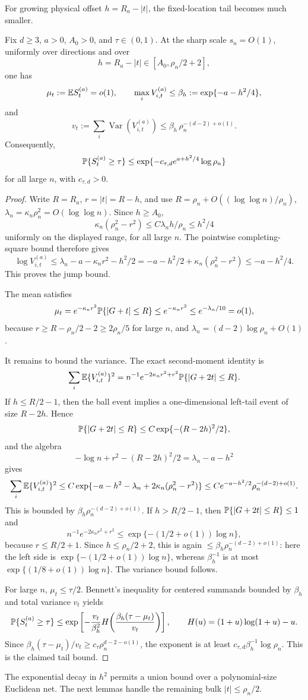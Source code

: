 For growing physical offset \(h=R_a-|t|\), the fixed-location tail becomes
much smaller.
\begin{lemma}
\label{lem:growing-offset-fixed-t}
Fix \(d\ge3\), \(a>0\), \(A_0>0\), and \(\tau\in(0,1)\).  At the sharp
scale \(s_n=O(1)\), uniformly over directions and over
\[
    h=R_a-|t|\in[A_0,\rho_n/2+2],
\]
one has
\[
    \mu_t:=\mathbb E S_t^{(a)}=o(1),\qquad
    \max_i V_{i,t}^{(a)}\le \beta_h:=\exp\{-a-h^2/4\},
\]
and
\[
    v_t:=\sum_i\operatorname{Var}(V_{i,t}^{(a)})
    \le
    \beta_h\,\rho_n^{-(d-2)+o(1)} .
\]
Consequently,
\[
    \mathbb P\{S_t^{(a)}\ge\tau\}
    \le
    \exp\{-c_{\tau,d}e^{a+h^2/4}\log\rho_n\}
\]
for all large \(n\), with \(c_{\tau,d}>0\).
\end{lemma}

\begin{proof}
Write \(R=R_a\), \(r=|t|=R-h\), and use \(R=\rho_n+O((\log\log n)/\rho_n)\),
\(\lambda_n=\kappa_n\rho_n^2=O(\log\log n)\).  Since \(h\ge A_0\),
\[
    \kappa_n(\rho_n^2-r^2)
    \le
    C\lambda_n h/\rho_n
    \le h^2/4
\]
uniformly on the displayed range, for all large \(n\).  The pointwise
completing-square bound therefore gives
\[
    \log V_{i,t}^{(a)}
    \le
    \lambda_n-a-\kappa_nr^2-h^2/2
    =
    -a-h^2/2+\kappa_n(\rho_n^2-r^2)
    \le -a-h^2/4 .
\]
This proves the jump bound.

The mean satisfies
\[
    \mu_t
    =
    e^{-\kappa_nr^2}\mathbb P\{|G+t|\le R\}
    \le
    e^{-\kappa_nr^2}
    \le
    e^{-\lambda_n/10}=o(1),
\]
because \(r\ge R-\rho_n/2-2\ge2\rho_n/5\) for large \(n\), and
\(\lambda_n=(d-2)\log\rho_n+O(1)\).

It remains to bound the variance.  The exact second-moment identity is
\[
    \sum_i\mathbb E\{V_{i,t}^{(a)}\}^2
    =
    n^{-1}e^{-2\kappa_nr^2+r^2}
    \mathbb P\{|G+2t|\le R\}.
\]
If \(h\le R/2-1\), then the ball event implies a one-dimensional
left-tail event of size \(R-2h\).  Hence
\[
    \mathbb P\{|G+2t|\le R\}
    \le
    C\exp\{-(R-2h)^2/2\},
\]
and the algebra
\[
    -\log n+r^2-(R-2h)^2/2
    =
    \lambda_n-a-h^2
\]
gives
\[
    \sum_i\mathbb E\{V_{i,t}^{(a)}\}^2
    \le
    C\exp\{-a-h^2-\lambda_n
        +2\kappa_n(\rho_n^2-r^2)\}
    \le
    C e^{-a-h^2/2}\rho_n^{-(d-2)+o(1)} .
\]
This is bounded by \(\beta_h\rho_n^{-(d-2)+o(1)}\).  If
\(h>R/2-1\), then \(\mathbb P\{|G+2t|\le R\}\le1\) and
\[
    n^{-1}e^{-2\kappa_nr^2+r^2}
    \le
    \exp\{-(1/2+o(1))\log n\},
\]
because \(r\le R/2+1\).  Since \(h\le\rho_n/2+2\), this is again
\(\le\beta_h\rho_n^{-(d-2)+o(1)}\): here the left side is
\(\exp\{-(1/2+o(1))\log n\}\), whereas \(\beta_h^{-1}\) is at most
\(\exp\{(1/8+o(1))\log n\}\).  The variance bound follows.

For large \(n\), \(\mu_t\le\tau/2\).  Bennett's inequality for centered
summands bounded by \(\beta_h\) and total variance \(v_t\) yields
\[
    \mathbb P\{S_t^{(a)}\ge\tau\}
    \le
    \exp\left[
        -\frac{v_t}{\beta_h^2}
        H\!\left(\frac{\beta_h(\tau-\mu_t)}{v_t}\right)
    \right],
    \qquad
    H(u)=(1+u)\log(1+u)-u .
\]
Since \(\beta_h(\tau-\mu_t)/v_t\ge c_\tau\rho_n^{d-2-o(1)}\), the
exponent is at least \(c_{\tau,d}\beta_h^{-1}\log\rho_n\).  This is the
claimed tail bound.
\end{proof}

The exponential decay in \(h^2\) permits a union bound over a polynomial-size
Euclidean net. The next lemmas handle the remaining bulk
\(|t|\le\rho_n/2\).
